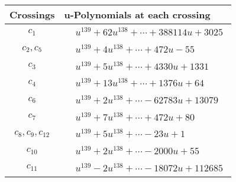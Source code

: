 \documentclass[1p]{elsarticle_modified}
\theoremstyle{definition}
\begin{document}
\begin{tabular}{m{50pt}|m{274pt}}
Crossings & \hspace{64pt}u-Polynomials at each crossing \\
\hline $$\begin{aligned}c_{1}\end{aligned}$$&$\begin{aligned}
&u^{139}+62 u^{138}+\cdots+388114 u+3025
\end{aligned}$\\
\hline $$\begin{aligned}c_{2},c_{5}\end{aligned}$$&$\begin{aligned}
&u^{139}+4 u^{138}+\cdots+472 u-55
\end{aligned}$\\
\hline $$\begin{aligned}c_{3}\end{aligned}$$&$\begin{aligned}
&u^{139}+5 u^{138}+\cdots+4330 u+1331
\end{aligned}$\\
\hline $$\begin{aligned}c_{4}\end{aligned}$$&$\begin{aligned}
&u^{139}+13 u^{138}+\cdots+1376 u+64
\end{aligned}$\\
\hline $$\begin{aligned}c_{6}\end{aligned}$$&$\begin{aligned}
&u^{139}+2 u^{138}+\cdots-62783 u+13079
\end{aligned}$\\
\hline $$\begin{aligned}c_{7}\end{aligned}$$&$\begin{aligned}
&u^{139}+7 u^{138}+\cdots+472 u+80
\end{aligned}$\\
\hline $$\begin{aligned}c_{8},c_{9},c_{12}\end{aligned}$$&$\begin{aligned}
&u^{139}+5 u^{138}+\cdots-23 u+1
\end{aligned}$\\
\hline $$\begin{aligned}c_{10}\end{aligned}$$&$\begin{aligned}
&u^{139}+2 u^{138}+\cdots-2000 u+55
\end{aligned}$\\
\hline $$\begin{aligned}c_{11}\end{aligned}$$&$\begin{aligned}
&u^{139}-2 u^{138}+\cdots-18072 u+112685
\end{aligned}$\\
\hline
\end{tabular}\\~\\
\end{document}
